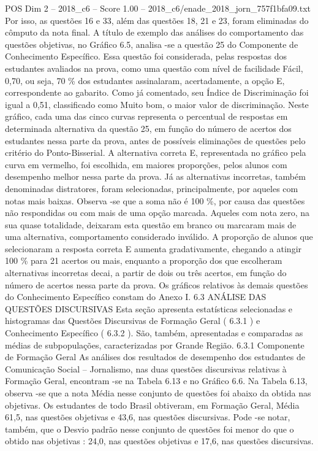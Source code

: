 \begin{textsample}{POS Dim 2 – 2018\_c6 – Score 1.00 – 2018\_c6/enade\_2018\_jorn\_757f1bfa09.txt}
Por isso, as questões 16 e 33, além das questões 18, 21 e 23, foram eliminadas do cômputo da nota final.
A título de exemplo das análises do comportamento das questões objetivas, no Gráfico 6.5, analisa -se a questão 25 do Componente de Conhecimento Específico.
Essa questão foi considerada, pelas respostas dos estudantes avaliados na prova, como uma questão com nível de facilidade Fácil, 0,70, ou seja, 70 \% dos estudantes assinalaram, acertadamente, a opção E, correspondente ao gabarito.
Como já comentado, seu Índice de Discriminação foi igual a 0,51, classificado como Muito bom, o maior valor de discriminação.
Neste gráfico, cada uma das cinco curvas representa o percentual de respostas em determinada alternativa da questão 25, em função do número de acertos dos estudantes nessa parte da prova, antes de possíveis eliminações de questões pelo critério do Ponto-Bisserial.
A alternativa correta E, representada no gráfico pela curva em vermelho, foi escolhida, em maiores proporções, pelos alunos com desempenho melhor nessa parte da prova.
Já as alternativas incorretas, também denominadas distratores, foram selecionadas, principalmente, por aqueles com notas mais baixas.
Observa -se que a soma não é 100 \%, por causa das questões não respondidas ou com mais de uma opção marcada.
Aqueles com nota zero, na sua quase totalidade, deixaram esta questão em branco ou marcaram mais de uma alternativa, comportamento considerado inválido.
A proporção de alunos que selecionaram a resposta correta E aumenta gradativamente, chegando a atingir 100 \% para 21 acertos ou mais, enquanto a proporção dos que escolheram alternativas incorretas decai, a partir de dois ou três acertos, em função do número de acertos nessa parte da prova.
Os gráficos relativos às demais questões do Conhecimento Específico constam do Anexo I. 6.3 ANÁLISE DAS QUESTÕES DISCURSIVAS Esta seção apresenta estatísticas selecionadas e histogramas das Questões Discursivas de Formação Geral ( 6.3.1 ) e Conhecimento Específico ( 6.3.2 ).
São, também, apresentadas e comparadas as médias de subpopulações, caracterizadas por Grande Região. 6.3.1 Componente de Formação Geral As análises dos resultados de desempenho dos estudantes de Comunicação Social – Jornalismo, nas duas questões discursivas relativas à Formação Geral, encontram -se na Tabela 6.13 e no Gráfico 6.6.
Na Tabela 6.13, observa -se que a nota Média nesse conjunto de questões foi abaixo da obtida nas objetivas.
Os estudantes de todo Brasil obtiveram, em Formação Geral, Média 61,5, nas questões objetivas e 43,6, nas questões discursivas.
Pode -se notar, também, que o Desvio padrão nesse conjunto de questões foi menor do que o obtido nas objetivas : 24,0, nas questões objetivas e 17,6, nas questões discursivas.

\end{textsample}
